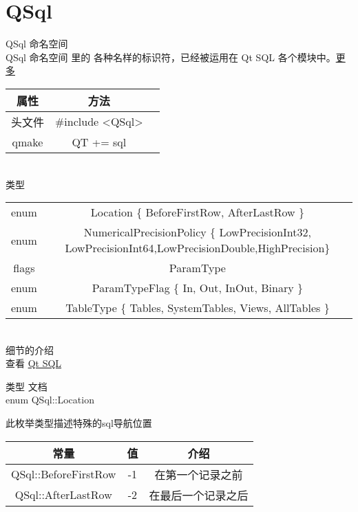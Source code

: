 \chapter{QSql}
QSql 命名空间\\

QSql 命名空间 里的 各种名样的标识符，已经被运用在 Qt SQL 各个模块中。\href{https://doc.qt.io/qt-5/qsql.html#details}{更多} \\

\begin{tabular}{|c|c|p{1.5cm}|}
	\hline
	属性 & 方法 \\
	\hline
	头文件 & \#include <QSql>\\      
	\hline
	qmake & QT += sql\\      
	\hline
\end{tabular}\\

类型\\

\begin{tabular}{|c|c|}
	\hline
	 &  \\
	\hline
	enum & Location \{ BeforeFirstRow, AfterLastRow \}\\      
	\hline
	enum & NumericalPrecisionPolicy \{ LowPrecisionInt32, LowPrecisionInt64,LowPrecisionDouble,HighPrecision\}\\      
	\hline
	flags & ParamType \\
	\hline 
	enum & ParamTypeFlag \{ In, Out, InOut, Binary \} \\ 
	\hline
	enum & TableType \{ Tables, SystemTables, Views, AllTables \}\\
	\hline
\end{tabular}\\

细节的介绍 \\

查看 \href{https://doc.qt.io/qt-5/qtsql-index.html}{Qt SQL}

类型 文档\\ 

enum QSql::Location


此枚举类型描述特殊的sql导航位置


\begin{tabular}{|c|c|c|}
	\hline
	常量	& 值 & 介绍 \\
	\hline
	QSql::BeforeFirstRow&-1&在第一个记录之前\\
	\hline
	QSql::AfterLastRow&-2&在最后一个记录之后\\
	\hline
\end{tabular}\\

